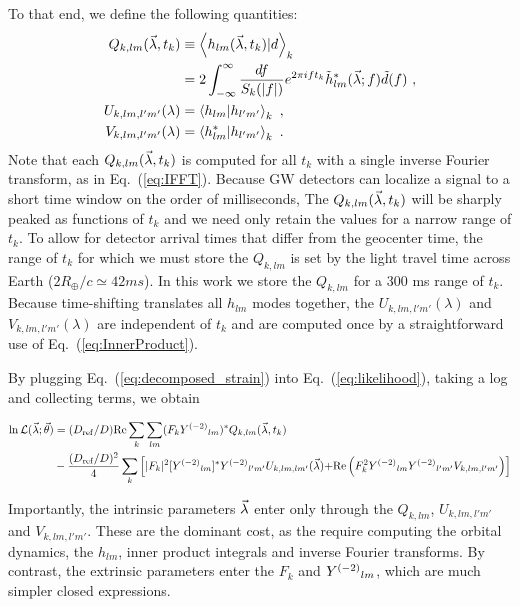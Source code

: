 To that end, we define the following quantities:
\begin{subequations}
\label{eq:QUV}
\begin{align}
Q_{k,lm}(\vec{\lambda},t_k) &\equiv \left\langle h_{lm}(\vec{\lambda},t_k)|d\right\rangle_k \nonumber\\
&= 2 \int_{-\infty}^{\infty} \frac{df}{S_k(|f|)} e^{2\pi i f t_k} \tilde{h}_{lm}^*(\vec{\lambda};f) \tilde{d}(f)\ , \\
{ U_{k,lm,l'm'}(\lambda)}& = \left\langle h_{lm}|h_{l'm'}\right\rangle_k\ , \\
V_{k,lm,l'm'}(\lambda)& = \left\langle h_{lm}^*|h_{l'm'}\right\rangle_k  \ .
\end{align}
\end{subequations}
Note that each $Q_{k,lm}(\vec{\lambda},t_k)$ is computed for all $t_k$ with a single inverse Fourier transform, 
as in Eq.~(\ref{eq:IFFT}). Because GW detectors can localize a signal to a short time window 
on the order of milliseconds, The $Q_{k,lm}(\vec{\lambda},t_k)$ will be sharply peaked as functions of $t_k$ 
and we need only retain the values for a narrow range of $t_k$. To allow for detector arrival times that differ
from the geocenter time, the range of $t_k$ for which we must store the $Q_{k,lm}$ is set by the light travel
time across Earth ($2R_{\oplus}/c\simeq 42 \unit{ms}$).   In this work we store the $Q_{k,lm}$ for a $300$ ms range of
$t_k$.  
Because time-shifting translates all $h_{lm}$ modes together, 
the $U_{k,lm,l'm'}(\lambda)$ and $V_{k,lm,l'm'}(\lambda)$ are independent of $t_k$
and are computed once by a straightforward use of Eq.~(\ref{eq:InnerProduct}).


By plugging Eq.~(\ref{eq:decomposed_strain}) into Eq.~(\ref{eq:likelihood}), taking a log and collecting terms, we obtain
\begin{widetext}
\begin{align}
\ln {\cal L}(\vec{\lambda}; \vec{\theta}) 
&= (D_{\rm ref}/D) \text{Re} \sum_k \sum_{lm}(F_k Y^{(-2)}{}_{lm})^* Q_{k,lm}(\vec{\lambda},t_k)\nonumber \\
&   -\frac{(D_{\rm ref}/D)^2}{4}\sum_k
\left[
{
|F_k|^2 [Y^{(-2)}{}_{lm}]^*Y^{(-2)}{}_{l'm'} U_{k,lm,lm'}(\vec{\lambda})
}
 {
+  \text{Re} \left( F_k^2 Y^{(-2)}{}_{lm} Y^{(-2)}{}_{l'm'} V_{k,lm,l'm'} \right)
}
\right]
\label{eq:def:lnL:Decomposed}
\end{align}
\end{widetext}
Importantly, the intrinsic parameters $\vec{\lambda}$ enter only through the $Q_{k,lm}$, $U_{k,lm,l'm'}$ and $V_{k,lm,l'm'}$.
These are the dominant cost, as the require computing the orbital dynamics, the $h_{lm}$, inner product integrals
and inverse Fourier transforms. By contrast, the extrinsic parameters enter the $F_k$ and $Y^{(-2)}{}_{lm}$,
which are much simpler closed expressions.

